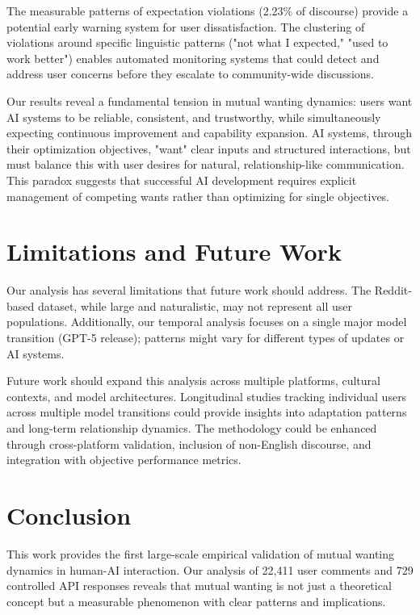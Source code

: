 \documentclass{article}
\begin{document}
The measurable patterns of expectation violations (2.23\% of discourse) provide a potential early warning system for user dissatisfaction. The clustering of violations around specific linguistic patterns ("not what I expected," "used to work better") enables automated monitoring systems that could detect and address user concerns before they escalate to community-wide discussions.

Our results reveal a fundamental tension in mutual wanting dynamics: users want AI systems to be reliable, consistent, and trustworthy, while simultaneously expecting continuous improvement and capability expansion. AI systems, through their optimization objectives, "want" clear inputs and structured interactions, but must balance this with user desires for natural, relationship-like communication. This paradox suggests that successful AI development requires explicit management of competing wants rather than optimizing for single objectives.

\section{Limitations and Future Work}

Our analysis has several limitations that future work should address. The Reddit-based dataset, while large and naturalistic, may not represent all user populations. Additionally, our temporal analysis focuses on a single major model transition (GPT-5 release); patterns might vary for different types of updates or AI systems.

Future work should expand this analysis across multiple platforms, cultural contexts, and model architectures. Longitudinal studies tracking individual users across multiple model transitions could provide insights into adaptation patterns and long-term relationship dynamics. The methodology could be enhanced through cross-platform validation, inclusion of non-English discourse, and integration with objective performance metrics.

\section{Conclusion}

This work provides the first large-scale empirical validation of mutual wanting dynamics in human-AI interaction. Our analysis of 22,411 user comments and 729 controlled API responses reveals that mutual wanting is not just a theoretical concept but a measurable phenomenon with clear patterns and implications.
\end{document}
